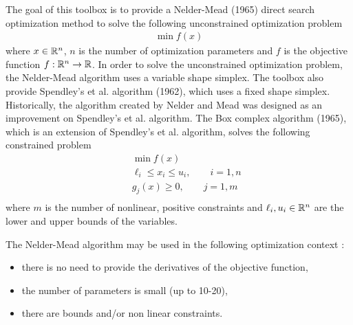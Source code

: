 The goal of this toolbox is to provide a Nelder-Mead (1965) direct search optimization method to solve the 
following unconstrained optimization problem
\begin{eqnarray}
\min f(x)
\end{eqnarray}
where $x\in \mathbb{R}^n$, $n$ is the number of optimization parameters and $f$ is the objective 
function $f:\mathbb{R}^n\rightarrow \mathbb{R}$.
In order to solve the unconstrained optimization problem, the Nelder-Mead 
algorithm uses a variable shape simplex. The toolbox also provide Spendley's et al. 
algorithm \cite{Spendley1962} (1962), which uses a fixed shape simplex. Historically, the algorithm created  
by Nelder and Mead was designed as an improvement on Spendley's et al. algorithm.
The Box complex algorithm \cite{Box1965} (1965), which is an extension of Spendley's  et al. algorithm, solves the 
following constrained problem
\begin{eqnarray}
&&\min f(x)\\
&&\ell_i \leq x_i \leq u_i, \qquad i = 1,n\\
&&g_j(x)\geq 0, \qquad j = 1, m\\
\end{eqnarray}
where $m$ is the number of nonlinear, positive constraints and $\ell_i,u_i\in \mathbb{R}^n$ are the lower 
and upper bounds of the variables.

The Nelder-Mead algorithm may be used in the following optimization context :
\begin{itemize}
\item there is no need to provide the derivatives of the objective function,
\item the number of parameters is small (up to 10-20),
\item there are bounds and/or non linear constraints.
\end{itemize}

